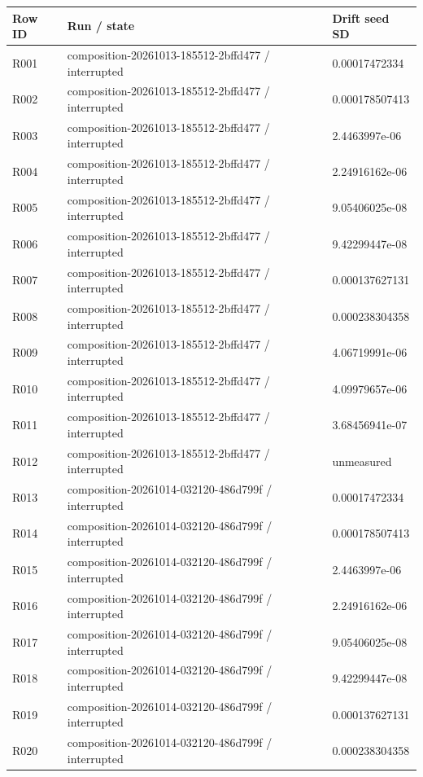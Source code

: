 \documentclass[10pt]{article}
\begin{document}
{\scriptsize\setlength{\tabcolsep}{2pt}
\begin{longtable}{p{}p{}p{}}
Row ID & Run / state & Drift seed SD \\
\hline\endhead
R001 & composition-20261013-185512-2bffd477 / interrupted & 0.00017472334 \\
R002 & composition-20261013-185512-2bffd477 / interrupted & 0.000178507413 \\
R003 & composition-20261013-185512-2bffd477 / interrupted & 2.4463997e-06 \\
R004 & composition-20261013-185512-2bffd477 / interrupted & 2.24916162e-06 \\
R005 & composition-20261013-185512-2bffd477 / interrupted & 9.05406025e-08 \\
R006 & composition-20261013-185512-2bffd477 / interrupted & 9.42299447e-08 \\
R007 & composition-20261013-185512-2bffd477 / interrupted & 0.000137627131 \\
R008 & composition-20261013-185512-2bffd477 / interrupted & 0.000238304358 \\
R009 & composition-20261013-185512-2bffd477 / interrupted & 4.06719991e-06 \\
R010 & composition-20261013-185512-2bffd477 / interrupted & 4.09979657e-06 \\
R011 & composition-20261013-185512-2bffd477 / interrupted & 3.68456941e-07 \\
R012 & composition-20261013-185512-2bffd477 / interrupted & unmeasured \\
R013 & composition-20261014-032120-486d799f / interrupted & 0.00017472334 \\
R014 & composition-20261014-032120-486d799f / interrupted & 0.000178507413 \\
R015 & composition-20261014-032120-486d799f / interrupted & 2.4463997e-06 \\
R016 & composition-20261014-032120-486d799f / interrupted & 2.24916162e-06 \\
R017 & composition-20261014-032120-486d799f / interrupted & 9.05406025e-08 \\
R018 & composition-20261014-032120-486d799f / interrupted & 9.42299447e-08 \\
R019 & composition-20261014-032120-486d799f / interrupted & 0.000137627131 \\
R020 & composition-20261014-032120-486d799f / interrupted & 0.000238304358 \\

\end{longtable}}
\end{document}
